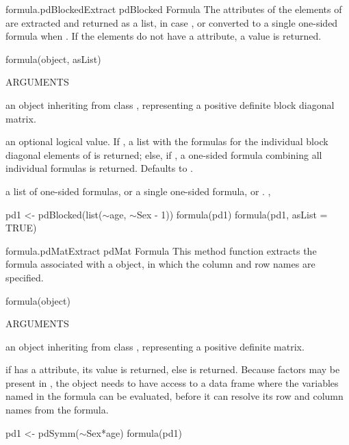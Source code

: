 \documentclass[pdftex]{article} \usepackage{url,graphicx}
\renewcommand{\Twiddle}{\mbox{\(\sim\)}}
\begin{document}
\begin{Helpfile}{formula.pdBlocked}{Extract pdBlocked Formula}
The  attributes of the  elements of
 are extracted and returned as a list, in case
, or converted to a single one-sided formula when
. If the  elements do not have a
 attribute, a  value is returned.
\begin{Example}
formula(object, asList)
\end{Example}
\begin{Argument}{ARGUMENTS}
\item[\Co{object:}]
an object inheriting from class ,
representing a positive definite block diagonal matrix.
\item[\Co{asList:}]
an optional logical value. If , a list with
the formulas for the individual block diagonal elements of
 is returned; else, if , a one-sided formula
combining all individual formulas is returned. Defaults to
.
\end{Argument}
a list of one-sided formulas, or a single one-sided formula, or
.
, 
\need 15pt
\vspace{-16pt} 
\begin{Example}
pd1 <- pdBlocked(list(\Twiddle age, \Twiddle Sex - 1))
formula(pd1)
formula(pd1, asList = TRUE)
\end{Example}
\end{Helpfile}
\begin{Helpfile}{formula.pdMat}{Extract pdMat Formula}
This method function extracts the formula associated with a
 object, in which the column and row names are specified.
\begin{Example}
formula(object)
\end{Example}
\begin{Argument}{ARGUMENTS}
\item[\Co{object:}]
an object inheriting from class , representing
a positive definite matrix.
\end{Argument}
if  has a  attribute, its value is
returned, else  is returned.
 Because factors may be present in , the
 object needs to have access to a data frame where the
variables named in the formula can be evaluated, before it can resolve
its row and column names from the formula.
\need 15pt
\vspace{-16pt} 
\begin{Example}
pd1 <- pdSymm(\Twiddle Sex*age)
formula(pd1)
\end{Example}
\end{Helpfile}
\end{document}
